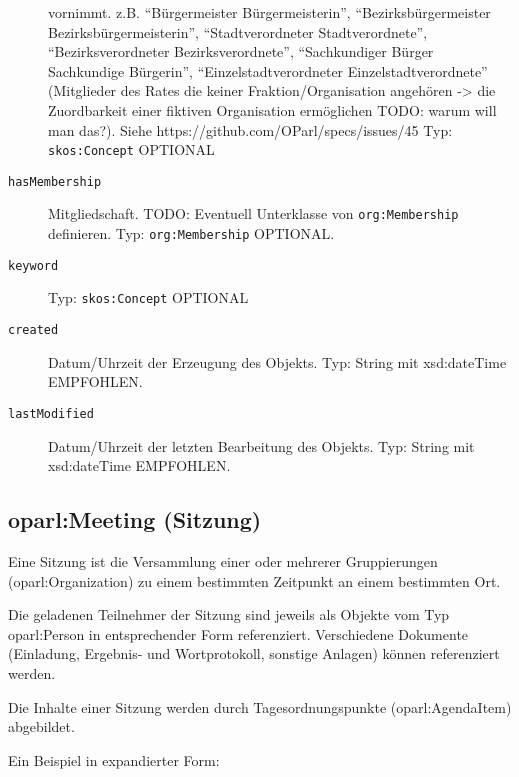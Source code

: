 \documentclass[,a4paper]{article}
\begin{document}
\begin{description}
vornimmt. z.B. ``Bürgermeister \textbar{} Bürgermeisterin'',
``Bezirksbürgermeister \textbar{} Bezirksbürgermeisterin'',
``Stadtverordneter \textbar{} Stadtverordnete'', ``Bezirksverordneter
\textbar{} Bezirksverordnete'', ``Sachkundiger Bürger \textbar{}
Sachkundige Bürgerin'', ``Einzelstadtverordneter \textbar{}
Einzelstadtverordnete'' (Mitglieder des Rates die keiner
Fraktion/Organisation angehören -\textgreater{} die Zuordbarkeit einer
fiktiven Organisation ermöglichen TODO: warum will man das?). Siehe
https://github.com/OParl/specs/issues/45 Typ: \texttt{skos:Concept}
OPTIONAL
\item[\texttt{hasMembership}]
Mitgliedschaft. TODO: Eventuell Unterklasse von \texttt{org:Membership}
definieren. Typ: \texttt{org:Membership} OPTIONAL.
\item[\texttt{keyword}]
Typ: \texttt{skos:Concept} OPTIONAL
\item[\texttt{created}]
Datum/Uhrzeit der Erzeugung des Objekts. Typ: String mit xsd:dateTime
EMPFOHLEN.
\item[\texttt{lastModified}]
Datum/Uhrzeit der letzten Bearbeitung des Objekts. Typ: String mit
xsd:dateTime EMPFOHLEN.
\end{description}

\subsection{oparl:Meeting (Sitzung)}\label{oparlux5fmeeting}

Eine Sitzung ist die Versammlung einer oder mehrerer Gruppierungen
(oparl:Organization) zu einem bestimmten Zeitpunkt an einem bestimmten
Ort.

Die geladenen Teilnehmer der Sitzung sind jeweils als Objekte vom Typ
oparl:Person in entsprechender Form referenziert. Verschiedene Dokumente
(Einladung, Ergebnis- und Wortprotokoll, sonstige Anlagen) können
referenziert werden.

Die Inhalte einer Sitzung werden durch Tagesordnungspunkte
(oparl:AgendaItem) abgebildet.

Ein Beispiel in expandierter Form:
\end{document}
